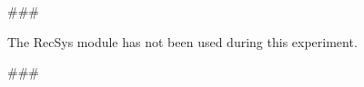 
\usepackage{comment}


###

The RecSys module has not been used during this experiment.
\hfill\break
\hfill\break

###


\begin{comment}
Author = DIEGO MICCOLI
Alias = Kozen88
Organization = SWAP Research Group UniBa
Date = 27-12-2023

This mini template is not working by itself because there are latex command missing needed
to compile the file and give as output a pdf file, in addition it has been added jinja
statement in order to control the rendering of the latex file with the jinja library, for these
reasons it needs to be used with the other mini chunks in conjunction.
\end{comment}
